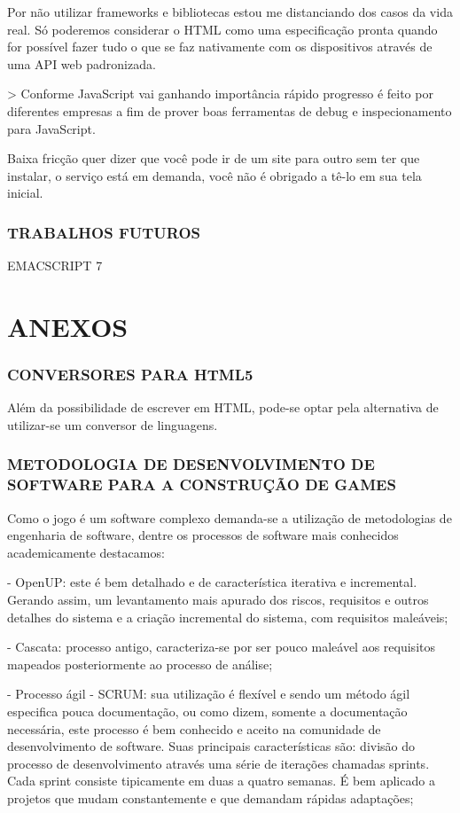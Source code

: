 \documentclass[11pt,a4paper]{article}
\begin{document}
Por não utilizar frameworks e bibliotecas estou me distanciando
dos casos da vida real. Só poderemos considerar o HTML como uma
especificação pronta quando
for possível fazer tudo o que se faz nativamente com os dispositivos
através de uma API web padronizada.

> Conforme JavaScript vai ganhando importância rápido progresso é
feito por diferentes empresas a fim de prover boas ferramentas de debug
e inspecionamento para JavaScript.

Baixa fricção quer dizer que você pode ir de um site para outro sem
ter que instalar, o serviço está em demanda, você não é obrigado a
tê-lo em sua tela inicial.


\subsubsection{ TRABALHOS FUTUROS}

EMACSCRIPT 7


\section{ANEXOS}

\subsubsection{ CONVERSORES PARA HTML5}
Além da possibilidade de escrever em HTML, pode-se optar pela
alternativa de utilizar-se um conversor de linguagens.

\subsubsection{ METODOLOGIA DE DESENVOLVIMENTO DE SOFTWARE PARA A CONSTRUÇÃO DE GAMES}

Como o jogo é um software complexo demanda-se a utilização de
metodologias de engenharia de software, dentre os processos de software
mais conhecidos academicamente destacamos:

- OpenUP: este é bem detalhado e de característica iterativa e
incremental. Gerando assim, um levantamento mais apurado dos riscos,
requisitos e outros detalhes do sistema e a criação incremental do
sistema, com requisitos maleáveis;

- Cascata: processo antigo, caracteriza-se por ser pouco maleável aos
requisitos mapeados posteriormente ao processo de análise;

- Processo ágil - SCRUM: sua utilização é flexível e sendo
um método ágil especifica pouca documentação, ou como dizem,
somente a documentação necessária, este processo é bem conhecido e
aceito na comunidade de desenvolvimento de software. Suas principais
características são: divisão do processo de desenvolvimento através
uma série de iterações chamadas sprints. Cada sprint consiste
tipicamente em duas a quatro semanas. É bem aplicado a projetos que
mudam constantemente e que demandam rápidas adaptações;
\end{document}
